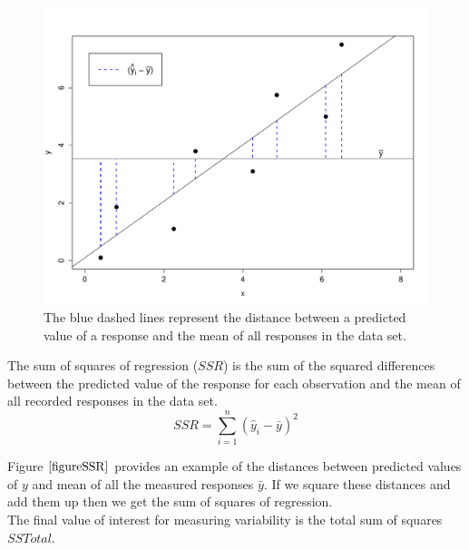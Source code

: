 \begin{figure}[H]
	\begin{center}
	\includegraphics[width=12cm]{Section8/plotSSR.pdf}
	\end{center}
	\vspace{-0.750cm}
	\label{figureSSR}
	\caption{The blue dashed lines represent the distance between 
		a predicted value of a response and the 
		mean of all responses in the data set. }
\end{figure}

\begin{definition}
The sum of squares of regression ($SSR$) 
is the sum of the squared differences between 
the predicted value of the response for each observation 
and the mean of all recorded responses in the data set.
	\begin{equation}
	\label{equationSSR}
	SSR = \sum_{i=1}^{n} ( \hat{y}_{i} - \bar{y} )^{2}
	\end{equation}
\end{definition}
\hfill

\noindent
Figure $\ref{figureSSR}$ provides an example of the distances between
predicted values of $y$ and mean of all the measured responses $\bar{y}$.
If we square these distances and add them up then we get the 
sum of squares of regression.\\

The final value of interest for measuring variability 
is the total sum of squares $SSTotal$.

